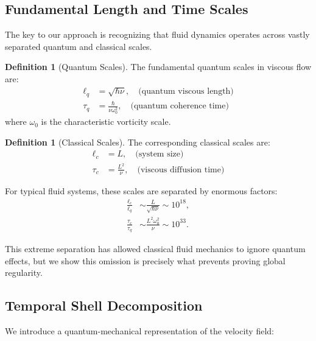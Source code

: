 \documentclass[11pt,a4paper]{article}
\theoremstyle{definition}
\newtheorem{definition}[theorem]{Definition}
\begin{document}
\subsection{Fundamental Length and Time Scales}

The key to our approach is recognizing that fluid dynamics operates across vastly separated quantum and classical scales.

\begin{definition}[Quantum Scales]
The fundamental quantum scales in viscous flow are:
\begin{align}
\ell_q &= \sqrt{\hbar \nu}, \quad \text{(quantum viscous length)}\\
\tau_q &= \frac{\hbar}{\nu \omega_0^2}, \quad \text{(quantum coherence time)}
\end{align}
where $\omega_0$ is the characteristic vorticity scale.
\end{definition}

\begin{definition}[Classical Scales]
The corresponding classical scales are:
\begin{align}
\ell_c &= L, \quad \text{(system size)}\\
\tau_c &= \frac{L^2}{\nu}, \quad \text{(viscous diffusion time)}
\end{align}
\end{definition}

For typical fluid systems, these scales are separated by enormous factors:
\begin{align}
\frac{\ell_c}{\ell_q} &\sim \frac{L}{\sqrt{\hbar \nu}} \sim 10^{18},\\
\frac{\tau_c}{\tau_q} &\sim \frac{L^2 \omega_0^2}{\nu} \sim 10^{33}.
\end{align}

This extreme separation has allowed classical fluid mechanics to ignore quantum effects, but we show this omission is precisely what prevents proving global regularity.

\subsection{Temporal Shell Decomposition}

We introduce a quantum-mechanical representation of the velocity field:
\end{document}
